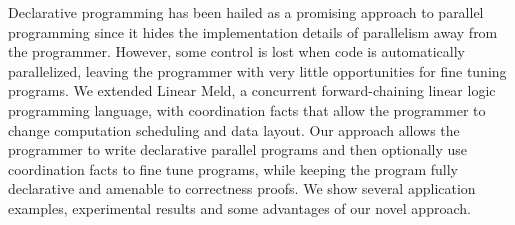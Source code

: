 Declarative programming has been hailed as a promising approach to parallel
programming since it hides the implementation details of parallelism away from the
programmer. However, some control is lost when code is
automatically parallelized, leaving the programmer with very little
opportunities for fine tuning programs.
We extended Linear Meld, a concurrent forward-chaining linear logic programming
language, with coordination facts that allow the programmer to change
computation scheduling and data layout. Our approach allows the programmer to
write declarative parallel programs and then optionally use coordination facts
to fine tune programs, while keeping the program fully declarative and amenable
to correctness proofs. We show several application examples, experimental
results and some advantages of our novel approach.
